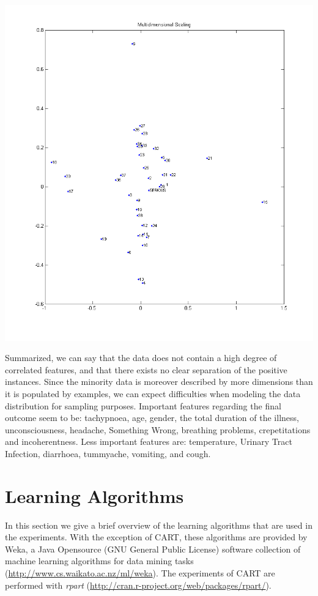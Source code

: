 \includegraphics[scale=0.70]{img/mds_corr_stdN.png}

Summarized, we can say that the data does not contain a high degree of correlated features, and that there exists no clear separation of the positive instances. Since the minority data is moreover described by more dimensions than it is populated by examples, we can expect difficulties when modeling the data distribution for sampling purposes. Important features regarding the final outcome seem to be: tachypnoea, age, gender, the total duration of the illness, unconsciousness, headache, Something Wrong, breathing problems, crepetitations and incoherentness. Less important features are: temperature, Urinary Tract Infection, diarrhoea, tummyache, vomiting, and cough.


\newpage
\section{Learning Algorithms}\label{theclassifiers}
In this section we give a brief overview of the learning algorithms that are used in the experiments. With the exception of CART, these algorithms are provided by Weka, a Java Opensource (GNU General Public License) software collection of machine learning algorithms for data mining tasks (\url{http://www.cs.waikato.ac.nz/ml/weka}). The experiments of CART are performed with \textit{rpart} (\url{http://cran.r-project.org/web/packages/rpart/}).

